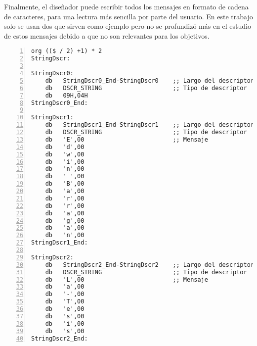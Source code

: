 	Finalmente, el diseñador puede escribir todos los mensajes en formato de cadena de caracteres, para una lectura más sencilla por parte del usuario. En este trabajo solo se usan dos que sirven como ejemplo pero no se profundizó más en el estudio de estos mensajes debido a que no son relevantes para los objetivos.
	
	\begin{lstlisting}[language={[x86masm]Assembler},backgroundcolor=\color{gray!30},numbers=left]
org (($ / 2) +1) * 2	
StringDscr:
	
StringDscr0:
	db   StringDscr0_End-StringDscr0    ;; Largo del descriptor
	db   DSCR_STRING					;; Tipo de descriptor
	db   09H,04H
StringDscr0_End:
	
StringDscr1:
	db   StringDscr1_End-StringDscr1    ;; Largo del descriptor
	db   DSCR_STRING					;; Tipo de descriptor
	db   'E',00							;; Mensaje
	db   'd',00
	db   'w',00
	db   'i',00
	db   'n',00
	db   ' ',00
	db   'B',00
	db   'a',00	
	db   'r',00
	db   'r',00
	db   'a',00
	db   'g',00
	db   'a',00
	db   'n',00
StringDscr1_End:
	
StringDscr2:
	db   StringDscr2_End-StringDscr2    ;; Largo del descriptor
	db   DSCR_STRING					;; Tipo de descriptor
	db   'L',00							;; Mensaje
	db   'a',00
	db   '-',00
	db   'T',00
	db   'e',00
	db   's',00
	db   'i',00
	db   's',00
StringDscr2_End:
	\end{lstlisting}
	
	
%	
